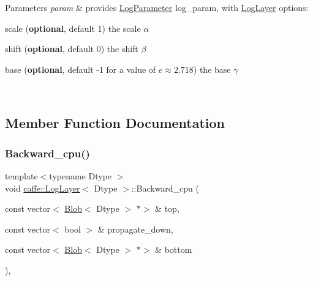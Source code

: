 \begin{DoxyParams}{Parameters}
{\em param} & provides \mbox{\hyperlink{classcaffe_1_1_log_parameter}{Log\+Parameter}} log\+\_\+param, with \mbox{\hyperlink{classcaffe_1_1_log_layer}{Log\+Layer}} options\+:
\begin{DoxyItemize}
\item scale ({\bfseries optional}, default 1) the scale $ \alpha $
\item shift ({\bfseries optional}, default 0) the shift $ \beta $
\item base ({\bfseries optional}, default -\/1 for a value of $ e \approx 2.718 $) the base $ \gamma $ 
\end{DoxyItemize}\\
\hline
\end{DoxyParams}


\subsection{Member Function Documentation}
\mbox{\label{classcaffe_1_1_log_layer_a79f6398d807b7d751820528d5a68faa7}} 
\subsubsection{\texorpdfstring{Backward\+\_\+cpu()}{Backward\_cpu()}\hspace{0.1cm}{\footnotesize\ttfamily [1/2]}}
{\footnotesize\ttfamily template$<$typename Dtype $>$ \\
void \mbox{\hyperlink{classcaffe_1_1_log_layer}{caffe\+::\+Log\+Layer}}$<$ Dtype $>$\+::Backward\+\_\+cpu (\begin{DoxyParamCaption}\item[{const vector$<$ \mbox{\hyperlink{classcaffe_1_1_blob}{Blob}}$<$ Dtype $>$ $\ast$$>$ \&}]{top,  }\item[{const vector$<$ bool $>$ \&}]{propagate\+\_\+down,  }\item[{const vector$<$ \mbox{\hyperlink{classcaffe_1_1_blob}{Blob}}$<$ Dtype $>$ $\ast$$>$ \&}]{bottom }\end{DoxyParamCaption})\hspace{0.3cm}{\ttfamily [protected]}, {\ttfamily [virtual]}}



